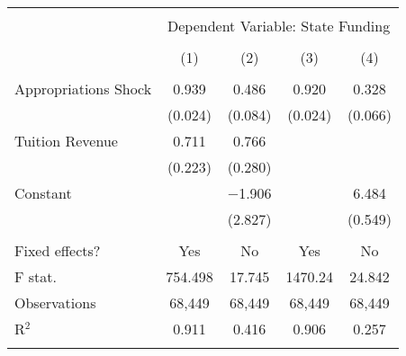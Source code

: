 
\begin{tabular}{@{\extracolsep{5pt}}lcccc} 
\\[-1.8ex]\hline 
\hline \\[-1.8ex] 
 & \multicolumn{4}{c}{Dependent Variable: State Funding} \\ 
\cline{2-5} 
\\[-1.8ex] & (1) & (2) & (3) & (4)\\ 
\hline \\[-1.8ex] 
 Appropriations Shock & 0.939 & 0.486 & 0.920 & 0.328 \\ 
  & (0.024) & (0.084) & (0.024) & (0.066) \\ 
  Tuition Revenue & 0.711 & 0.766 &  &  \\ 
  & (0.223) & (0.280) &  &  \\ 
  Constant &  & $-$1.906 &  & 6.484 \\ 
  &  & (2.827) &  & (0.549) \\ 
 \hline \\[-1.8ex] 
Fixed effects? & Yes & No & Yes & No \\ 
F stat. & 754.498 & 17.745 & 1470.24 & 24.842 \\ 
Observations & 68,449 & 68,449 & 68,449 & 68,449 \\ 
R$^{2}$ & 0.911 & 0.416 & 0.906 & 0.257 \\ 
\hline 
\hline \\[-1.8ex] 
\end{tabular} 
